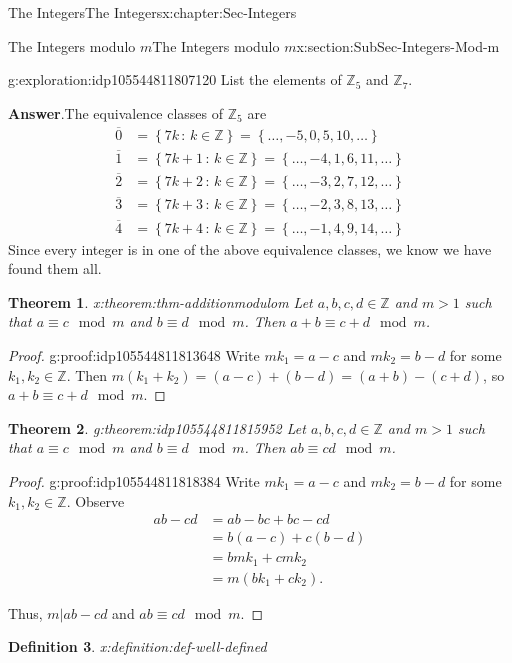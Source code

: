 \documentclass[oneside,10pt,]{book}
\newcommand{\blocktitlefont}{\relax}
\numberwithin{equation}{section}
\newcommand{\set}[1]{\left\{ {#1} \right\}}
\newcommand{\setof}[2]{{\left\{#1\,\colon\,#2\right\}}}
\def\Z{{\mathbb Z}}
\newtheorem{theorem}{Theorem}[section]
\newtheorem{definition}[theorem]{Definition}
\newcommand{\amp}{&}
\begin{document}
\begin{chapterptx}{The Integers}{}{The Integers}{}{}{x:chapter:Sec-Integers}
\begin{sectionptx}{The Integers modulo \(m\)}{}{The Integers modulo \(m\)}{}{}{x:section:SubSec-Integers-Mod-m}
\begin{exploration}{}{g:exploration:idp105544811807120}
List the elements of \(\Z_5\) and \(\Z_7\).%
\par\smallskip%
\noindent\textbf{\blocktitlefont Answer}.\hypertarget{g:answer:idp105544811808656}{}\quad{}The equivalence classes of \(\Z_5\) are%
\begin{align*}
\overline{0} \amp = \setof{7k}{k\in\Z} = \set{\ldots, -5, 0, 5, 10, \ldots}\\
\overline{1} \amp = \setof{7k+1}{k\in\Z} = \set{\ldots, -4, 1, 6, 11, \ldots}\\
\overline{2} \amp = \setof{7k+2}{k\in\Z} = \set{\ldots, -3, 2, 7, 12, \ldots}\\
\overline{3} \amp = \setof{7k+3}{k\in\Z} = \set{\ldots, -2, 3, 8, 13, \ldots}\\
\overline{4} \amp = \setof{7k+4}{k\in\Z} = \set{\ldots, -1, 4, 9, 14, \ldots}
\end{align*}
Since every integer is in one of the above equivalence classes, we know we have found them all.%
\end{exploration}%
\begin{theorem}{}{}{x:theorem:thm-additionmodulom}%
Let \(a,b, c,d\in \Z\) and \(m > 1\) such that \(a\equiv c\mod m\) and \(b\equiv d\mod m\). Then \(a+b \equiv c + d \mod m\).%
\end{theorem}
\begin{proof}{}{g:proof:idp105544811813648}
Write \(mk_1 = a-c\) and \(m k_2 = b-d\) for some \(k_1,k_2\in \Z\). Then \(m(k_1 + k_2) = (a-c) + (b-d) = (a+b) - (c+d)\), so \(a+b \equiv c+d\mod m\).%
\end{proof}
\begin{theorem}{}{}{g:theorem:idp105544811815952}%
Let \(a,b, c,d\in \Z\) and \(m > 1\) such that \(a\equiv c\mod m\) and \(b\equiv d\mod m\). Then \(ab \equiv c d\mod m\).%
\end{theorem}
\begin{proof}{}{g:proof:idp105544811818384}
Write \(mk_1 = a-c\) and \(m k_2 = b-d\) for some \(k_1,k_2\in \Z\). Observe%
\begin{align*}
ab -cd \amp = ab - bc + bc - cd\\
\amp = b(a-c) + c(b-d)\\
\amp = bmk_1 + cmk_2\\
\amp = m(bk_1 + ck_2)\text{.}
\end{align*}
%
\par
Thus, \(m|ab-cd\) and \(ab \equiv cd\mod m\).%
\end{proof}
\begin{definition}{}{x:definition:def-well-defined}%

\end{definition}
\end{sectionptx}
\end{chapterptx}
\end{document}
